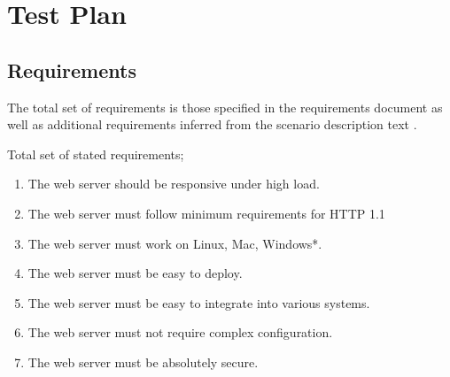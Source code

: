 %
%
%


\section{Test Plan}
%
%


%
%


\subsection{Requirements}
The total set of requirements is those specified in the requirements document
\cite{2dv610:assignment2-requirements} as well as additional requirements
inferred from the scenario description text
\cite{2dv610:assignment2-instructions}.

Total set of stated requirements;
\begin{enumerate}
  \item The web server should be responsive under high load.
  \item The web server must follow minimum requirements for HTTP 1.1
  \item The web server must work on Linux, Mac, Windows*.
  \item The web server must be easy to deploy.
  \item The web server must be easy to integrate into various systems.
  \item The web server must not require complex configuration.
  \item The web server must be absolutely secure.
\end{enumerate}


